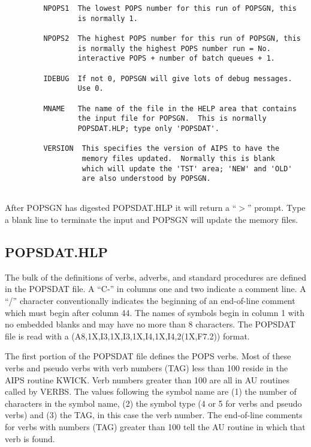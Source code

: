 \begin{verbatim}
         NPOPS1  The lowest POPS number for this run of POPSGN, this
                 is normally 1.

         NPOPS2  The highest POPS number for this run of POPSGN, this
                 is normally the highest POPS number run = No.
                 interactive POPS + number of batch queues + 1.

         IDEBUG  If not 0, POPSGN will give lots of debug messages.
                 Use 0.

         MNAME   The name of the file in the HELP area that contains
                 the input file for POPSGN.  This is normally
                 POPSDAT.HLP; type only 'POPSDAT'.

         VERSION  This specifies the version of AIPS to have the
                  memory files updated.  Normally this is blank
                  which will update the 'TST' area; 'NEW' and 'OLD'
                  are also understood by POPSGN.


\end{verbatim}
After POPSGN has digested POPSDAT.HLP it will return a ``$>$'' prompt.
Type a blank line to terminate the input and POPSGN will update the
memory files.

\subsection{POPSDAT.HLP}

The bulk of the definitions of verbs, adverbs, and standard procedures
are defined in the POPSDAT file.  A ``C-'' in columns one and two
indicate a comment line.  A ``/'' character conventionally indicates
the beginning of an end-of-line comment which must begin after column
44. The names of symbols begin in column 1 with no embedded blanks and
may have no more than 8 characters. The POPSDAT file is read with a
(A8,1X,I3,1X,I3,1X,I4,1X,I4,2(1X,F7.2)) format.

The first portion of the POPSDAT file defines the POPS verbs.  Most of
these verbs and pseudo verbs with verb numbers (TAG) less than 100
reside in the AIPS routine KWICK. Verb numbers greater than 100 are
all in AU routines called by VERBS. The values following the symbol
name are (1) the number of characters in the symbol name, (2) the
symbol type (4 or 5 for verbs and pseudo verbs) and (3) the TAG, in
this case the verb number.  The end-of-line comments for verbs with
numbers (TAG) greater than 100 tell the AU routine in which that verb
is found.

